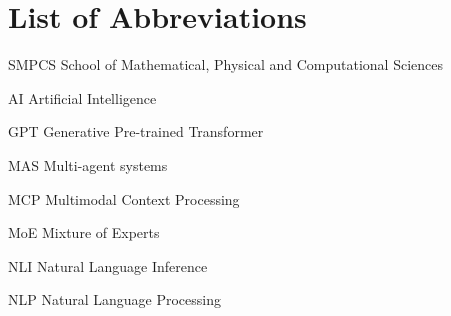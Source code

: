 \chapter*{List of Abbreviations}
\begin{abbrv}
    
    \item[SMPCS]			School of Mathematical, Physical and Computational Sciences
    
    \item[AI]			Artificial Intelligence
    \item[GPT]			Generative Pre-trained Transformer
    \item[MAS]			Multi-agent systems
    \item[MCP]			Multimodal Context Processing
    \item[MoE]			Mixture of Experts
    \item[NLI]			Natural Language Inference
    \item[NLP]			Natural Language Processing
    
\end{abbrv}
